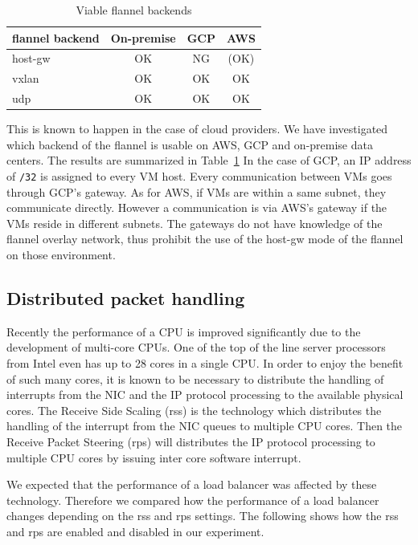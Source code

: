 \begin{table}
  \begin{tabular}{lccc}
    \toprule
    flannel backend & On-premise & GCP & AWS \\
    \midrule
    host-gw & OK & NG & (OK) \\
    vxlan & OK & OK & OK \\
    udp & OK & OK & OK \\
    \bottomrule
\end{tabular}
  \caption{Viable flannel backends}
  \label{tab:Viable flannel backends}
\end{table}

This is known to happen in the case of cloud providers.  
We have investigated which backend of the flannel is usable on AWS, GCP and on-premise data centers.
The results are summarized in Table~\ref{tab:Viable flannel backends}
%
In the case of GCP, an IP address of {\tt /32} is assigned to every VM host.
Every communication between VMs goes through GCP's gateway.
As for AWS, if VMs are within a same subnet, they communicate directly.
However a communication is via AWS's gateway if the VMs reside in different subnets.
The gateways do not have knowledge of the flannel overlay network, 
thus prohibit the use of the host-gw mode of the flannel on those environment.  


\subsection{Distributed packet handling}

Recently the performance of a CPU is improved significantly due to the development of multi-core CPUs.
One of the top of the line server processors from Intel even has up to 28 cores in a single CPU.
In order to enjoy the benefit of such many cores, 
it is known to be necessary to distribute the handling of interrupts from the NIC and the IP protocol processing
to the available physical cores.
The Receive Side Scaling (rss)\cite{TomHerbert} is the technology 
which distributes the handling of the interrupt from the NIC queues to multiple CPU cores.
Then the Receive Packet Steering (rps)\cite{TomHerbert} will distributes the IP protocol processing 
to multiple CPU cores by issuing inter core software interrupt.

We expected that the performance of a load balancer was affected  by these technology.
Therefore we compared how the performance of a load balancer changes depending on the rss and rps settings.
The following shows how the rss and rps are enabled and disabled in our experiment. 

